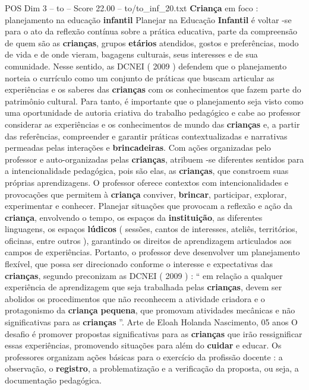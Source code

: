\begin{textsample}{POS Dim 3 – to – Score 22.00 – to/to\_inf\_20.txt}  \label{ex:f3_pos_109}
\textbf{Criança} em foco : planejamento na educação \textbf{infantil} Planejar na Educação \textbf{Infantil} é voltar -se para o ato da reflexão contínua sobre a prática educativa, parte da compreensão de quem são as \textbf{crianças}, grupos \textbf{etários} atendidos, gostos e preferências, modo de vida e de onde vieram, bagagens culturais, seus interesses e de sua comunidade.
Nesse sentido, as DCNEI ( 2009 ) defendem que o planejamento norteia o currículo como um conjunto de práticas que buscam articular as experiências e os saberes das \textbf{crianças} com os conhecimentos que fazem parte do patrimônio cultural.
Para tanto, é importante que o planejamento seja visto como uma oportunidade de autoria criativa do trabalho pedagógico e cabe ao professor considerar as experiências e os conhecimentos de mundo das \textbf{crianças} e, a partir das referências, compreender e garantir práticas contextualizadas e narrativas permeadas pelas interações e \textbf{brincadeiras}.
Com ações organizadas pelo professor e auto-organizadas pelas \textbf{crianças}, atribuem -se diferentes sentidos para a intencionalidade pedagógica, pois são elas, as \textbf{crianças}, que constroem suas próprias aprendizagens.
O professor oferece contextos com intencionalidades e provocações que permitem à \textbf{criança} conviver, \textbf{brincar}, participar, explorar, experimentar e conhecer.
Planejar situações que provocam a reflexão e ação da \textbf{criança}, envolvendo o tempo, os espaços da \textbf{instituição}, as diferentes linguagens, os espaços \textbf{lúdicos} ( sessões, cantos de interesses, ateliês, territórios, oficinas, entre outros ), garantindo os direitos de aprendizagem articulados aos campos de experiências.
Portanto, o professor deve desenvolver um planejamento flexível, que possa ser direcionado conforme o interesse e expectativas das \textbf{crianças}, segundo preconizam as DCNEI ( 2009 ) : “ em relação a qualquer experiência de aprendizagem que seja trabalhada pelas \textbf{crianças}, devem ser abolidos os procedimentos que não reconhecem a atividade criadora e o protagonismo da \textbf{criança} \textbf{pequena}, que promovam atividades mecânicas e não significativas para as \textbf{crianças} ”.
Arte de Eloah Holanda Nascimento, 05 anos O desafio é promover propostas significativas para as \textbf{crianças} que irão ressignificar essas experiências, promovendo situações para além do \textbf{cuidar} e educar.
Os professores organizam ações básicas para o exercício da profissão docente : a observação, o \textbf{registro}, a problematização e a verificação da proposta, ou seja, a documentação pedagógica.

\end{textsample}
